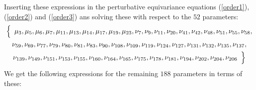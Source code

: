 \documentclass[a4paper,12pt, DIV=14, BCOR=5mm, twoside, headsepline]{scrbook}
\begin{document}
Inserting these expressions in the perturbative equivariance equations (\ref{order1}), (\ref{order2}) and (\ref{order3}) ans solving these with respect to the $52$ parameters:
\begin{multline}\label{AreaParas}
\Bigl\{\,\  \mu_{{3}},\mu_{{5}},\mu_{{6}},\mu_{{7}},\mu_{{11}},\mu_{{13}}
,\mu_{{14}},\mu_{{17}},\mu_{{19}},\mu_{{23}},\nu_{{7}},\nu_{{9}},\nu_{
{11}},\nu_{{20}},\nu_{{41}},\nu_{{42}},\nu_{{48}},\nu_{{51}},\nu_{{55}
},\nu_{{58}},\\\nu_{{59}},\nu_{{69}},\nu_{{77}},\nu_{{79}},\nu_{{80}},
\nu_{{81}},\nu_{{83}},\nu_{{90}},\nu_{{108}},\nu_{{109}},\nu_{{119}},
\nu_{{124}},\nu_{{127}},\nu_{{131}},\nu_{{132}},\nu_{{135}},\nu_{{137}
},\\\nu_{{139}},\nu_{{149}},\nu_{{151}},\nu_{{153}},\nu_{{155}},\nu_{{
160}},\nu_{{164}},\nu_{{165}},\nu_{{175}},\nu_{{178}},\nu_{{181}},\nu_
{{194}},\nu_{{202}},\nu_{{204}},\nu_{{206}} \,\  \Bigr\}
\end{multline}
We get the following expressions for the remaining $188$ parameters in terms of these:
\end{document}
